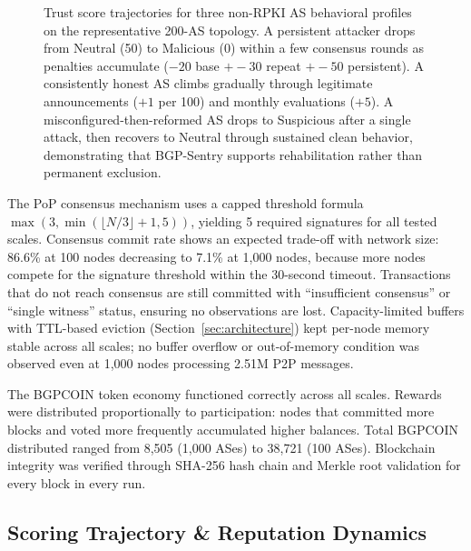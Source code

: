 \begin{figure}[t]
  \caption{Trust score trajectories for three non-RPKI AS behavioral profiles on the representative 200-AS topology. A persistent attacker drops from Neutral (50) to Malicious (0) within a
  few consensus rounds as penalties accumulate ($-20$ base $+ -30$ repeat $+ -50$ persistent). A consistently honest AS climbs gradually through legitimate announcements ($+1$ per 100) and
  monthly evaluations ($+5$). A misconfigured-then-reformed AS drops to Suspicious after a single attack, then recovers to Neutral through sustained clean behavior, demonstrating that
  BGP-Sentry supports rehabilitation rather than permanent exclusion.}
  \label{fig:trust_recovery}
  \end{figure}





The PoP consensus mechanism uses a capped threshold formula $\max(3, \min(\lfloor N/3 \rfloor + 1, 5))$, yielding 5 required signatures for all tested scales. Consensus commit rate shows an expected trade-off with network size: 86.6\% at 100 nodes decreasing to 7.1\% at 1{,}000 nodes, because more nodes compete for the signature threshold within the 30-second timeout. Transactions that do not reach consensus are still committed with ``insufficient consensus'' or ``single witness'' status, ensuring no observations are lost. Capacity-limited buffers with TTL-based eviction (Section~\ref{sec:architecture}) kept per-node memory stable across all scales; no buffer overflow or out-of-memory condition was observed even at 1{,}000 nodes processing 2.51M P2P messages.

The BGPCOIN token economy functioned correctly across all scales. Rewards were distributed proportionally to participation: nodes that committed more blocks and voted more frequently accumulated higher balances. Total BGPCOIN distributed ranged from 8,505 (1{,}000 ASes) to 38,721 (100 ASes). Blockchain integrity was verified through SHA-256 hash chain and Merkle root validation for every block in every run.


\subsection{Scoring Trajectory \& Reputation Dynamics}
 


